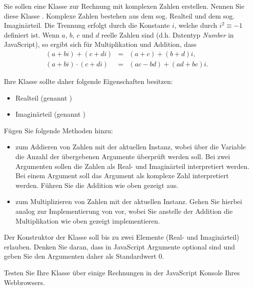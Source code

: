 %
\par Sie sollen eine Klasse zur Rechnung mit komplexen Zahlen erstellen. Nennen Sie diese Klasse . Komplexe Zahlen bestehen aus dem sog. Realteil und dem sog. Imaginärteil. Die Trennung erfolgt durch die Konstante $i$, welche durch $i^2 \equiv -1$ definiert ist. Wenn $a$, $b$, $c$ und $d$ reelle Zahlen sind (d.h. Datentyp \emph{Number} in JavaScript), so ergibt sich für Multiplikation und Addition, dass
%
\begin{eqnarray}
(a + b i) + (c + d i)     & = & (a + c) + (b + d) i,\\
(a + b i) \cdot (c + d i) & = & (ac - bd) + (ad + bc) i.
\end{eqnarray}
%
\par Ihre Klasse sollte daher folgende Eigenschaften besitzen:
%
\begin{itemize}
\item Realteil (genannt )
\item Imaginärteil (genannt )
\end{itemize}
%
\par Fügen Sie folgende Methoden hinzu:
%
\begin{itemize}
\item {} zum Addieren von Zahlen mit der aktuellen Instanz, wobei über die Variable  die Anzahl der übergebenen Argumente überprüft werden soll. Bei zwei Argumenten sollen die Zahlen als Real- und Imaginärteil interpretiert werden. Bei einem Argument soll das Argument als komplexe Zahl interpretiert werden. Führen Sie die Addition wie oben gezeigt aus.
%
\item {} zum Multiplizieren von Zahlen mit der aktuellen Instanz. Gehen Sie hierbei analog zur Implementierung von  vor, wobei Sie anstelle der Addition die Multiplikation wie oben gezeigt implementieren.
\end{itemize}
%
\par Der Konstruktor der Klasse soll bis zu zwei Elemente (Real- und Imaginärteil) erlauben. Denken Sie daran, dass in JavaScript Argumente optional sind und geben Sie den Argumenten daher als Standardwert $0$.
%
\par Testen Sie Ihre Klasse über einige Rechnungen in der JavaScript Konsole Ihres Webbrowsers.